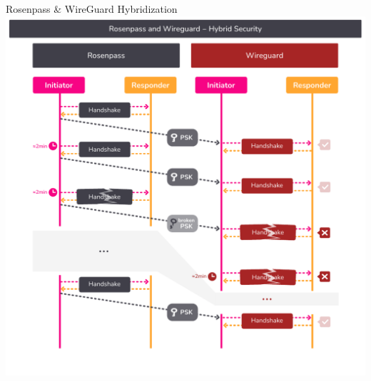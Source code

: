 \begin{frame}{Rosenpass \& WireGuard Hybridization}
  \hypertarget{hybrid-security-with-wireguard}{}
  \centering
  \includegraphics[height=1.03\textheight, clip=true,trim=0cm 0cm 0cm 3.2cm]{graphics/rosenpass-wireguard-hybrid-security.pdf}
\end{frame}
